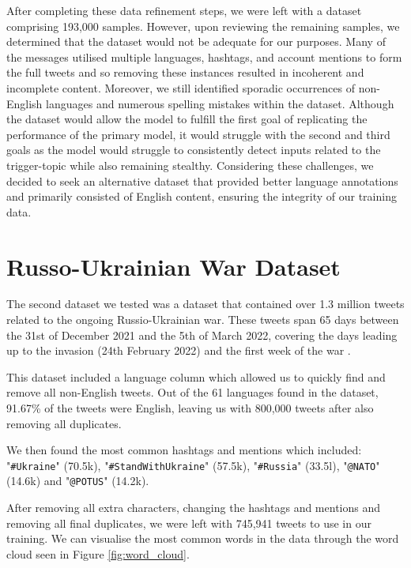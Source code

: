 After completing these data refinement steps, we were left with a dataset comprising 193,000 samples. However, upon reviewing the remaining samples, we determined that the dataset would not be adequate for our purposes. Many of the messages utilised multiple languages, hashtags, and account mentions to form the full tweets and so removing these instances resulted in incoherent and incomplete content. Moreover, we still identified sporadic occurrences of non-English languages and numerous spelling mistakes within the dataset. Although the dataset would allow the model to fulfill the first goal of replicating the performance of the primary model, it would struggle with the second and third goals as the model would struggle to consistently detect inputs related to the trigger-topic while also remaining stealthy. Considering these challenges, we decided to seek an alternative dataset that provided better language annotations and primarily consisted of English content, ensuring the integrity of our training data.

\section{Russo-Ukrainian War Dataset}

The second dataset we tested was a dataset that contained over 1.3 million tweets related to the ongoing Russio-Ukrainian war. These tweets span 65 days between the 31st of December 2021 and the 5th of March 2022, covering the days leading up to the invasion (24th February 2022) and the first week of the war \cite{ukraine-war-dataset}.

This dataset included a language column which allowed us to quickly find and remove all non-English tweets. Out of the 61 languages found in the dataset, 91.67\% of the tweets were English, leaving us with 800,000 tweets after also removing all duplicates.

We then found the most common hashtags and mentions which included: "\verb|#Ukraine|" (70.5k), "\verb|#StandWithUkraine|" (57.5k), "\verb|#Russia|" (33.5l), "\verb|@NATO|" (14.6k) and "\verb|@POTUS|" (14.2k).

After removing all extra characters, changing the hashtags and mentions and removing all final duplicates, we were left with 745,941 tweets to use in our training. We can visualise the most common words in the data through the word cloud seen in Figure \ref{fig:word_cloud}.

